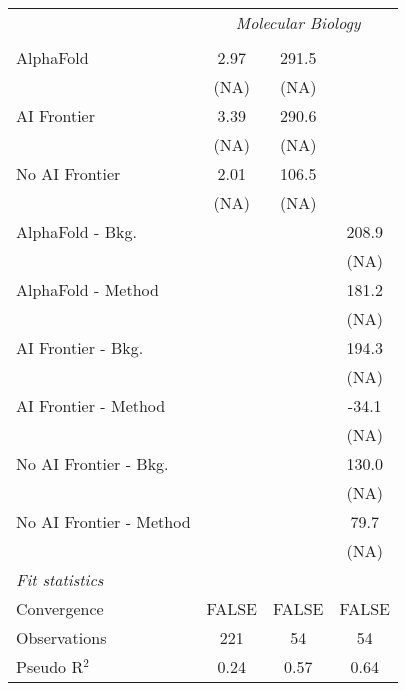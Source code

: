 \begin{tabular}{lccc}
 & \multicolumn{3}{c}{\textit{Molecular Biology}} \\ \\
   AlphaFold               & 2.97 & 291.5 &   \\   
                           & (NA) & (NA)  &   \\   
   AI Frontier             & 3.39 & 290.6 &   \\   
                           & (NA) & (NA)  &   \\   
   No AI Frontier          & 2.01 & 106.5 &   \\   
                           & (NA) & (NA)  &   \\   
   AlphaFold - Bkg.        &      &       & 208.9\\   
                           &      &       & (NA)\\   
   AlphaFold - Method      &      &       & 181.2\\   
                           &      &       & (NA)\\   
   AI Frontier - Bkg.      &      &       & 194.3\\   
                           &      &       & (NA)\\   
   AI Frontier - Method    &      &       & -34.1\\   
                           &      &       & (NA)\\   
   No AI Frontier - Bkg.   &      &       & 130.0\\   
                           &      &       & (NA)\\   
   No AI Frontier - Method &      &       & 79.7\\   
                           &      &       & (NA)\\   
   \midrule
   \emph{Fit statistics}\\
   Convergence             &FALSE & FALSE & FALSE\\  
   Observations            & 221  & 54    & 54\\  
   Pseudo R$^2$            & 0.24 & 0.57  & 0.64\\  
   

\end{tabular}
